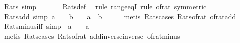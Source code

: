 \begin{isabellebody}
\endisatagproof
{\isafoldproof}%
%
\isadelimproof
\isanewline
%
\endisadelimproof
\isanewline
{}\isamarkupfalse%
\ Rats{\isacharunderscore}{\kern0pt}{}\ {\isacharbrackleft}{\kern0pt}simp{\isacharbrackright}{\kern0pt}{\isacharcolon}{\kern0pt}\ {\isachardoublequoteopen}{}\ {\isasymin}\ {\isasymrat}{\isachardoublequoteclose}\isanewline
%
\isadelimproof
\ \ %
\endisadelimproof
%
\isatagproof
{}\isamarkupfalse%
\ Rats{\isacharunderscore}{\kern0pt}def\ \isamarkupfalse%
\ {\isacharparenleft}{\kern0pt}rule\ range{\isacharunderscore}{\kern0pt}eqI{\isacharparenright}{\kern0pt}\ {\isacharparenleft}{\kern0pt}rule\ of{\isacharunderscore}{\kern0pt}rat{\isacharunderscore}{\kern0pt}{}\ {\isacharbrackleft}{\kern0pt}symmetric{\isacharbrackright}{\kern0pt}{\isacharparenright}{\kern0pt}%
\endisatagproof
{\isafoldproof}%
%
\isadelimproof
\isanewline
%
\endisadelimproof
\isanewline
{}\isamarkupfalse%
\ Rats{\isacharunderscore}{\kern0pt}add\ {\isacharbrackleft}{\kern0pt}simp{\isacharbrackright}{\kern0pt}{\isacharcolon}{\kern0pt}\ {\isachardoublequoteopen}a\ {\isasymin}\ {\isasymrat}\ {\isasymLongrightarrow}\ b\ {\isasymin}\ {\isasymrat}\ {\isasymLongrightarrow}\ a\ {\isacharplus}{\kern0pt}\ b\ {\isasymin}\ {\isasymrat}{\isachardoublequoteclose}\isanewline
%
\isadelimproof
\ \ %
\endisadelimproof
%
\isatagproof
{}\isamarkupfalse%
\ {\isacharparenleft}{\kern0pt}metis\ Rats{\isacharunderscore}{\kern0pt}cases\ Rats{\isacharunderscore}{\kern0pt}of{\isacharunderscore}{\kern0pt}rat\ of{\isacharunderscore}{\kern0pt}rat{\isacharunderscore}{\kern0pt}add{\isacharparenright}{\kern0pt}%
\endisatagproof
{\isafoldproof}%
%
\isadelimproof
\isanewline
%
\endisadelimproof
\isanewline
{}\isamarkupfalse%
\ Rats{\isacharunderscore}{\kern0pt}minus{\isacharunderscore}{\kern0pt}iff\ {\isacharbrackleft}{\kern0pt}simp{\isacharbrackright}{\kern0pt}{\isacharcolon}{\kern0pt}\ {\isachardoublequoteopen}{\isacharminus}{\kern0pt}\ a\ {\isasymin}\ {\isasymrat}\ {\isasymlongleftrightarrow}\ a\ {\isasymin}\ {\isasymrat}{\isachardoublequoteclose}\isanewline
%
\isadelimproof
\ \ %
\endisadelimproof
%
\isatagproof
{}\isamarkupfalse%
\ {\isacharparenleft}{\kern0pt}metis\ Rats{\isacharunderscore}{\kern0pt}cases\ Rats{\isacharunderscore}{\kern0pt}of{\isacharunderscore}{\kern0pt}rat\ add{\isachardot}{\kern0pt}inverse{\isacharunderscore}{\kern0pt}inverse\ of{\isacharunderscore}{\kern0pt}rat{\isacharunderscore}{\kern0pt}minus{\isacharparenright}{\kern0pt}%
\endisatagproof
{\isafoldproof}%

\end{isabellebody}
